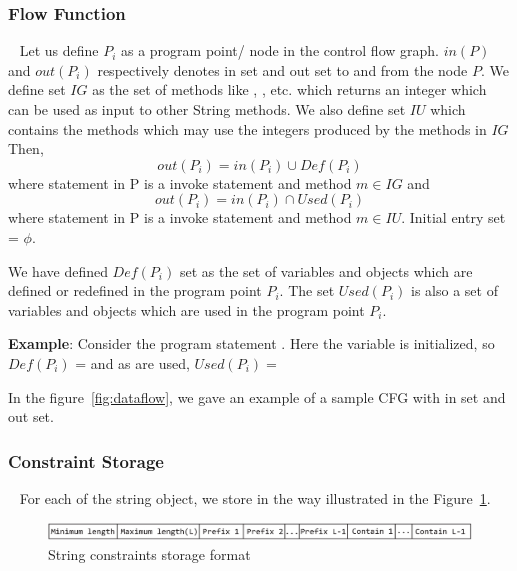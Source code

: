 \subsubsection{Flow Function}
\label{subsubsec:flowFunction}

~\newline
Let us define $P_i$ as a program point/ node in the control flow graph. $in(P)$
and $out(P_i)$ respectively denotes in set and out set to and from the node $P$.
We define set $IG$ as the set of methods like ,
,  etc. which returns an integer
which can be used as input to other String methods. We also define set $IU$
which contains the methods which may use the integers produced by the methods in
$IG$ Then, 
$$out(P_i) = in(P_i) \cup Def(P_i)$$ where statement in P is a invoke statement
and method $m \in IG$ and
$$out(P_i) = in(P_i) \cap Used(P_i)$$ where statement in P is a invoke statement
and method $m \in IU$. Initial entry set = ${\phi}$.


We have defined $Def(P_i)$ set as the set of variables and objects which are
defined or redefined in the program point $P_i$. The set $Used(P_i)$ is also a
set of variables and objects which are used in the program point $P_i$.

\textbf{Example}: Consider the program statement .
Here the variable  is initialized, so $Def(P_i)$ =  and
as
 are used, $Used(P_i) =$ 

In the figure~\ref{fig:dataflow}, we gave an example of a sample CFG with in set
and out set.


\subsubsection{Constraint Storage}
\label{subsubsec:constraintStorage}

~\newline
For each of the string object, we store in the way illustrated in the
Figure~\ref{fig:constraint}.

\begin{figure}[t]
\centering
\includegraphics[width=\linewidth]{images/constraint.eps}
\caption{String constraints storage format}
\label{fig:constraint}
\end{figure}

